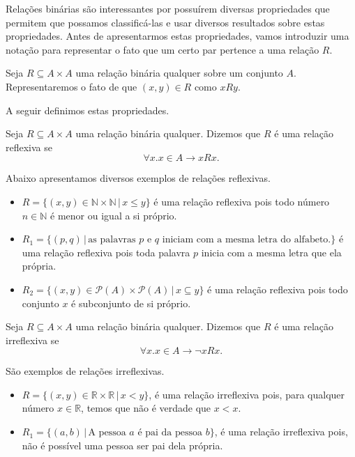 Relações binárias são interessantes por possuírem diversas
propriedades que permitem que possamos classificá-las e usar diversos
resultados sobre estas propriedades. Antes de apresentarmos estas propriedades,
vamos introduzir uma notação para representar o fato que um certo par
pertence a uma relação $R$.
\begin{Notation}
Seja $R\subseteq A \times A$ uma relação binária qualquer sobre um
conjunto $A$. Representaremos o fato de que $(x,y) \in R$ como $xRy$.
\end{Notation}
A seguir definimos estas propriedades.

\begin{Definition}
Seja $R\subseteq A \times A$ uma relação binária qualquer. Dizemos que
$R$ é uma relação reflexiva se
\[
\forall x. x\in A \to  xRx.
\]
\end{Definition}

\begin{Example}
Abaixo apresentamos diversos exemplos de relações reflexivas.
\begin{itemize}
  \item $R = \{(x,y) \in \mathbb{N} \times \mathbb{N}\,|\, x \leq
    y\}$ é uma relação reflexiva pois todo número $n\in\mathbb{N}$ é
    menor ou igual a si próprio.
  \item $R_1 = \{(p,q)\,|\,\text{as palavras $p$ e $q$ iniciam com a
      mesma letra do alfabeto.}\}$ é uma relação reflexiva pois toda
    palavra $p$ inicia com a mesma letra que ela própria.
  \item $R_2=\{(x,y)\in\mathcal{P}(A)\times\mathcal{P}(A)\,|\,x
    \subseteq y\}$ é uma relação reflexiva pois todo conjunto $x$ é
    subconjunto de si próprio.
\end{itemize}
\end{Example}

\begin{Definition}
Seja $R\subseteq A \times A$ uma relação binária qualquer. Dizemos que
$R$ é uma relação irreflexiva se
\[
\forall x. x\in A \to  \neg xRx.
\]
\end{Definition}

\begin{Example}
São exemplos de relações irreflexivas.
\begin{itemize}
  \item $R = \{(x,y)\in\mathbb{R}\times \mathbb{R}\,|\, x < y\}$, é
    uma relação irreflexiva pois, para qualquer número $x \in
    \mathbb{R}$, temos que não é verdade que $x < x$.
  \item $R_1 =\{(a,b) \,|\, \text{A pessoa $a$ é pai da pessoa
      $b$}\}$, é uma relação irreflexiva pois, não é possível uma
    pessoa ser pai dela própria.
\end{itemize}
\end{Example}

